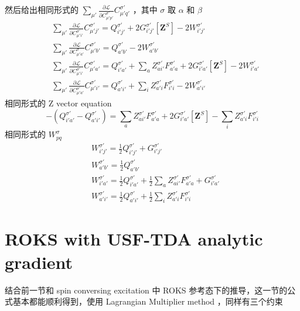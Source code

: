 \documentclass[11pt]{ctexart}
\numberwithin{equation}{section}
\begin{document}
然后给出相同形式的 $\sum_{\mu'}\frac{\partial\mathcal{L}}{\partial C_{\mu' p'}^{\sigma'}}C_{\mu'q'}^{\sigma'}$ ，其中 $\sigma$ 取 $\alpha$ 和 $\beta$
\begin{equation}
    \begin{aligned}
        & \sum_{\mu'}\frac{\partial\mathcal{L}}{\partial C_{\mu' i'}^{\sigma'}}C_{\mu' j'}^{\sigma'}
        = Q_{i' j'}^{\sigma'}
        + 2G_{i' j'}^{\sigma'}[\mathbf{Z}^S]
        - 2W_{i' j'}^{\sigma'}\\
        & \sum_{\mu'}\frac{\partial\mathcal{L}}{\partial C_{\mu' a'}^{\sigma}}C_{\mu' b'}^{\sigma'}
        = Q_{a' b'}^{\sigma'} 
        - 2W_{a' b'}^{\sigma'}\\
        & \sum_{\mu'}\frac{\partial\mathcal{L}}{\partial C_{\mu' i'}^{\sigma'}}C_{\mu' a'}^{\sigma'}
        = Q_{i' a'}^{\sigma'}
        + \sum_{a}Z_{a i'}^{\sigma'}F_{a' a}^{\sigma'}
        + 2G_{i' a'}^{\sigma'}[\mathbf{Z}^S]
        - 2W_{i' a'}^{\sigma'}\\
        & \sum_{\mu'}\frac{\partial\mathcal{L}}{\partial C_{\mu' a'}^{\sigma'}}C_{\mu' i'}^{\sigma'}
        = Q_{a' i'}^{\sigma'}
        + \sum_{i}Z_{a' i}^{\sigma'}F_{i' i}^{\sigma'}
        - 2W_{a' i'}^{\sigma'}
    \end{aligned}
\end{equation}
相同形式的 Z vector equation
\begin{equation}
    - (Q_{i'a'}^{\sigma'} - Q_{a'i'}^{\sigma'})
    = \sum_{a}Z_{ai'}^{\sigma'}F_{a'a}^{\sigma'} 
    + 2G_{i'a'}^{\sigma'}[\mathbf{Z}^S]
    - \sum_{i}Z_{a'i}^{\sigma'}F_{i'i}^{\sigma'}
\end{equation}
相同形式的 $W_{pq}^{\sigma}$
\begin{equation}
    \begin{aligned}
        & W_{i'j'}^{\sigma'} = \frac{1}{2}Q_{i'j'}^{\sigma'} + G_{i'j'}^{\sigma'}\\
        & W_{a'b'}^{\sigma'} = \frac{1}{2}Q_{a'b'}^{\sigma'}\\
        & W_{i'a'}^{\sigma'} = \frac{1}{2}Q_{i'a'}^{\sigma'} + \frac{1}{2}\sum_{a}Z_{ai'}^{\sigma'}F_{a'a}^{\sigma'} + G_{i'a'}^{\sigma'}\\
        & W_{a'i'}^{\sigma'} = \frac{1}{2}Q_{a'i'}^{\sigma'} + \frac{1}{2}\sum_{i}Z_{a'i}^{\sigma'}F_{i'i}^{\sigma'}
    \end{aligned}
\end{equation}

\section{ROKS with USF-TDA analytic gradient}
结合前一节和 spin conversing excitation 中 ROKS 参考态下的推导，这一节的公式基本都能顺利得到，使用 Lagrangian Multiplier method ，同样有三个约束 
\end{document}
